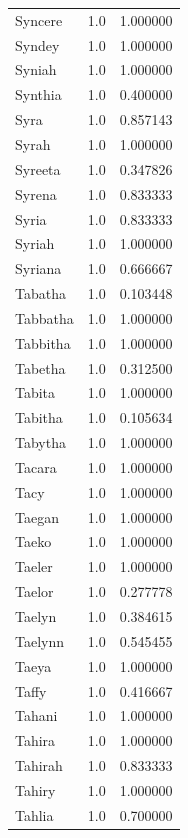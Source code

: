 \documentclass[
  letterpaper,
  DIV=11,
  numbers=noendperiod]{scrreprt}
\begin{document}
\begin{tabular}{lrr}
Syncere         &   1.0 &   1.000000 \\
Syndey          &   1.0 &   1.000000 \\
Syniah          &   1.0 &   1.000000 \\
Synthia         &   1.0 &   0.400000 \\
Syra            &   1.0 &   0.857143 \\
Syrah           &   1.0 &   1.000000 \\
Syreeta         &   1.0 &   0.347826 \\
Syrena          &   1.0 &   0.833333 \\
Syria           &   1.0 &   0.833333 \\
Syriah          &   1.0 &   1.000000 \\
Syriana         &   1.0 &   0.666667 \\
Tabatha         &   1.0 &   0.103448 \\
Tabbatha        &   1.0 &   1.000000 \\
Tabbitha        &   1.0 &   1.000000 \\
Tabetha         &   1.0 &   0.312500 \\
Tabita          &   1.0 &   1.000000 \\
Tabitha         &   1.0 &   0.105634 \\
Tabytha         &   1.0 &   1.000000 \\
Tacara          &   1.0 &   1.000000 \\
Tacy            &   1.0 &   1.000000 \\
Taegan          &   1.0 &   1.000000 \\
Taeko           &   1.0 &   1.000000 \\
Taeler          &   1.0 &   1.000000 \\
Taelor          &   1.0 &   0.277778 \\
Taelyn          &   1.0 &   0.384615 \\
Taelynn         &   1.0 &   0.545455 \\
Taeya           &   1.0 &   1.000000 \\
Taffy           &   1.0 &   0.416667 \\
Tahani          &   1.0 &   1.000000 \\
Tahira          &   1.0 &   1.000000 \\
Tahirah         &   1.0 &   0.833333 \\
Tahiry          &   1.0 &   1.000000 \\
Tahlia          &   1.0 &   0.700000 \\

\end{tabular}
\end{document}
